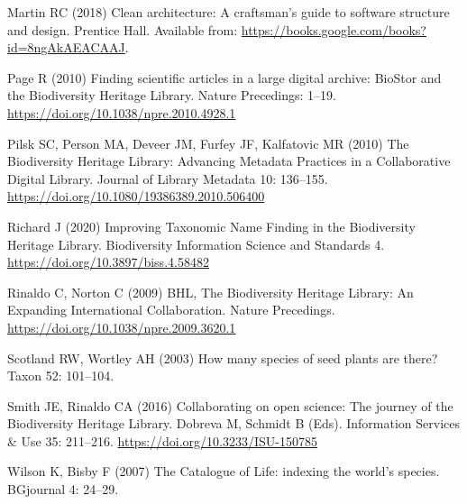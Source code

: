 \documentclass[
]{article}
\newlength{\cslhangindent}
\newlength{\cslentryspacingunit} %
\newenvironment{CSLReferences}[2] %
 {%
  \setlength{\parindent}{0pt}
  \ifodd #1
  \let\oldpar\par
  \def\par{\hangindent=\cslhangindent\oldpar}
  \fi
  \setlength{\parskip}{#2\cslentryspacingunit}
 }%
 {}
\begin{document}
\begin{CSLReferences}{1}{0}
\leavevmode{}%
Martin RC (2018) Clean architecture: A craftsman's guide to software
structure and design. Prentice Hall. Available from:
\url{https://books.google.com/books?id=8ngAkAEACAAJ}.

\leavevmode{}%
Page R (2010) {Finding scientific articles in a large digital archive:
BioStor and the Biodiversity Heritage Library}. Nature Precedings:
1--19. \url{https://doi.org/10.1038/npre.2010.4928.1}

\leavevmode{}%
Pilsk SC, Person MA, Deveer JM, Furfey JF, Kalfatovic MR (2010) {The
Biodiversity Heritage Library: Advancing Metadata Practices in a
Collaborative Digital Library}. Journal of Library Metadata 10:
136--155. \url{https://doi.org/10.1080/19386389.2010.506400}

\leavevmode{}%
Richard J (2020) {Improving Taxonomic Name Finding in the Biodiversity
Heritage Library}. Biodiversity Information Science and Standards 4.
\url{https://doi.org/10.3897/biss.4.58482}

\leavevmode{}%
Rinaldo C, Norton C (2009) {BHL, The Biodiversity Heritage Library: An
Expanding International Collaboration}. Nature Precedings.
\url{https://doi.org/10.1038/npre.2009.3620.1}

\leavevmode{}%
Scotland RW, Wortley AH (2003) {How many species of seed plants are
there?} Taxon 52: 101--104.

\leavevmode{}%
Smith JE, Rinaldo CA (2016) {Collaborating on open science: The journey
of the Biodiversity Heritage Library}. Dobreva M, Schmidt B (Eds).
Information Services \& Use 35: 211--216.
\url{https://doi.org/10.3233/ISU-150785}

\leavevmode{}%
Wilson K, Bisby F (2007) {The Catalogue of Life: indexing the world's
species}. BGjournal 4: 24--29.

\end{CSLReferences}
\end{document}
